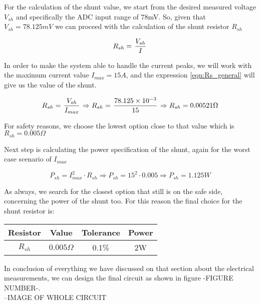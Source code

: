 For the calculation of the shunt value, we start from the desired measured voltage $V_{sh}$ and specifically the ADC input range of 78mV. So, given that $V_{sh} = 78.125mV$ we can proceed with the calculation of the shunt resistor $R_{sh}$

\begin{equation}
R_{sh} = \left. V_{sh} \over I \right.
\label{eqn:Rs_general}
\end{equation}

In order to make the system able to handle the current peaks, we will work with the maximum current value $I_{max}=15A$, and the expression \ref{eqn:Rs_general} will give us the value of the shunt.

\begin{equation}
R_{sh} = \left. V_{sh} \over I_{max} \right. \Rightarrow R_{sh} = \left. 78.125 \times 10^{-3} \over 15 \right. \Rightarrow R_{sh} = 0.00521\Omega
\label{eqn:Rs_calculation}
\end{equation}

For safety reasons, we choose the lowest option close to that value which is $R_{sh} = 0.005\Omega$

Next step is calculating the power specification of the shunt, again for the worst case scenario of $I_{max}$

\begin{equation}
P_{sh} = I_{max}^2 \cdot R_{sh} \Rightarrow P_{sh} = 15^2 \cdot 0.005 \Rightarrow P_{sh} = 1.125W
\label{eqn:Ps_calculation}
\end{equation}

As always, we search for the closest option that still is on the safe side, concerning the power of the shunt too. For this reason the final choice for the shunt resistor is:

\begin{center}
\begin{tabular}{ c c c c } 
 Resistor & Value & Tolerance & Power \\ \hline
 $R_{sh}$ & $0.005\Omega$ & 0.1\% & 2W \\ 
\end{tabular}
\end{center}

In conclusion of everything we have discussed on that section about the electrical measurements, we can design the final circuit as shown in figure -FIGURE NUMBER-.\\

--IMAGE OF WHOLE CIRCUIT\\

